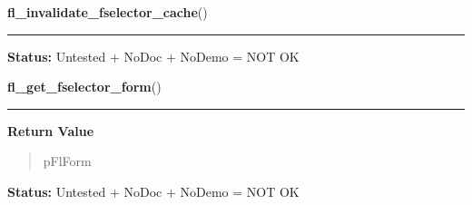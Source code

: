     \label{xformslib:flgoodies:fl_invalidate_fselector_cache}

    \vspace{0.5ex}

\hspace{.8\funcindent}\begin{boxedminipage}{\funcwidth}

    \raggedright \textbf{fl\_invalidate\_fselector\_cache}()

    \vspace{-1.5ex}

    \rule{\textwidth}{0.5\fboxrule}
\setlength{\parskip}{2ex}
\setlength{\parskip}{1ex}
\textbf{Status:} Untested + NoDoc + NoDemo = NOT OK



    \end{boxedminipage}

    \label{xformslib:flgoodies:fl_get_fselector_form}

    \vspace{0.5ex}

\hspace{.8\funcindent}\begin{boxedminipage}{\funcwidth}

    \raggedright \textbf{fl\_get\_fselector\_form}()

    \vspace{-1.5ex}

    \rule{\textwidth}{0.5\fboxrule}
\setlength{\parskip}{2ex}
\setlength{\parskip}{1ex}
      \textbf{Return Value}
    \vspace{-1ex}

      \begin{quote}
      pFlForm

      \end{quote}

\textbf{Status:} Untested + NoDoc + NoDemo = NOT OK



    \end{boxedminipage}

    \label{xformslib:flgoodies:fl_get_fselector_fdstruct}

